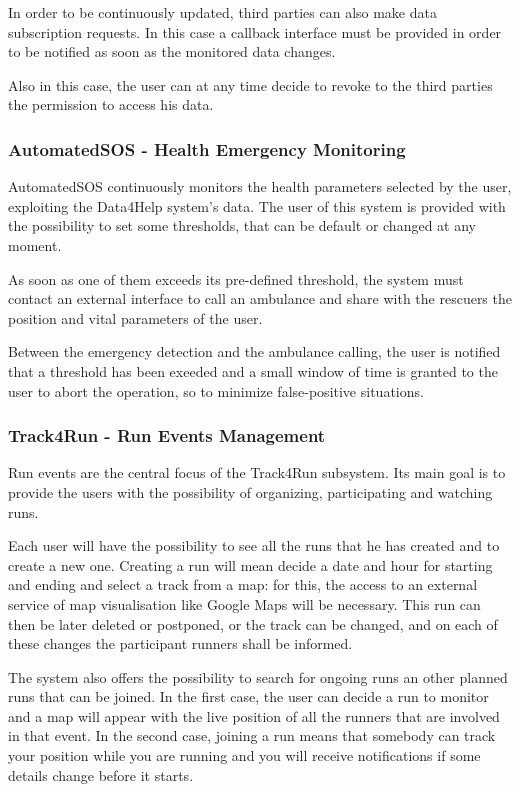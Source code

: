In order to be continuously updated, third parties can also make data subscription requests. In this case a callback interface must be provided in order to be notified as soon as the monitored data changes.

Also in this case, the user can at any time decide to revoke to the third parties the permission to access his data.

\subsubsection{AutomatedSOS - Health Emergency Monitoring}
AutomatedSOS continuously monitors the health parameters selected by the user, exploiting the Data4Help system's data. The user of this system is provided with the possibility to set some thresholds, that can be default or changed at any moment.

As soon as one of them exceeds its pre-defined threshold, the system must contact an external interface to call an ambulance and share with the rescuers the position and vital parameters of the user.

Between the emergency detection and the ambulance calling, the user is notified that a threshold has been exeeded and a small window of time is granted to the user to abort the operation, so to minimize false-positive situations.

\subsubsection{Track4Run - Run Events Management}
Run events are the central focus of the Track4Run subsystem. Its main goal is to provide the users with the possibility of organizing, participating and watching runs.

Each user will have the possibility to see all the runs that he has created and to create a new one. Creating a run will mean decide a date and hour for starting and ending and select a track from a map: for this, the access to an external service of map visualisation like Google Maps will be necessary. This run can then be later deleted or postponed, or the track can be changed, and on each of these changes the participant runners shall be informed.

The system also offers the possibility to search for ongoing runs an other planned runs that can be joined. In the first case, the user can decide a run to monitor and a map will appear with the live position of all the runners that are involved in that event. In the second case, joining a run means that somebody can track your position while you are running and you will receive notifications if some details change before it starts.

